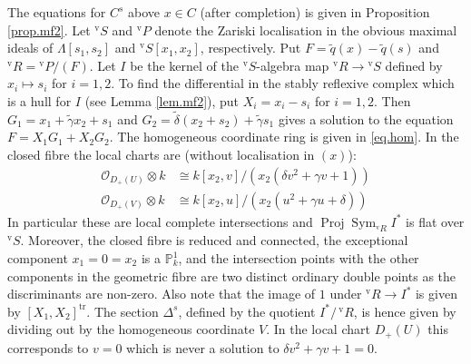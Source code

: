\documentclass[a4paper,10pt]{amsart}
\theoremstyle{plain}
\theoremstyle{definition}
\theoremstyle{remark}
\numberwithin{equation}{xx}
\DeclareMathOperator{\Proj}{Proj}
\DeclareMathOperator{\Sym}{Sym}
\newcommand{\ra}{\rightarrow}
\newcommand{\ot}{{\otimes}}
\newcommand{\vL}{\varLambda}
\newcommand{\BB}[1]{\mathbb{{#1}}}
\newcommand{\Q}{\mathcal{O}}
\begin{document}
The equations for \(C^{s}\) above \(x\in C\) (after completion) is given in Proposition \ref{prop.mf2}. Let \({}^{\text{v}\!}S\) and \({}^{\text{v}\!}P\) denote the Zariski localisation in the obvious maximal ideals of \(\vL[s_{1},s_{2}]\) and \({}^{\text{v}\!}S[x_{1},x_{2}]\), respectively. Put \(F=\tilde{q}(x)-\tilde{q}(s)\) and \({}^{\text{v}\!}R={}^{\text{v}\!}P/(F)\). Let \(I\) be the kernel of the \({}^{\text{v}\!}S\)-algebra map \({}^{\text{v}\!}R\ra {}^{\text{v}\!}S\) defined by \(x_{i}\mapsto s_{i}\) for \(i=1,2\). To find the differential in the stably reflexive complex which is a hull for \(I\) (see Lemma \ref{lem.mf2}), put \(X_{i}=x_{i}-s_{i}\) for \(i=1,2\). Then \(G_{1}=x_{1}+\tilde\gamma x_{2}+s_{1}\) and \(G_{2}=\tilde\delta (x_{2}+s_{2})+\tilde\gamma s_{1}\) gives a solution to the equation \(F=X_{1}G_{1}+X_{2}G_{2}\). The homogeneous coordinate ring is given in \eqref{eq.hom}. In the closed fibre the local charts are (without localisation in \((x)\)):
\begin{align}
\Q_{D_{+}(U)}\ot k &\cong k[x_{2},v]/(x_{2}(\delta v^{2}+\gamma v+1))\label{eq.v} \\
\Q_{D_{+}(V)}\ot k &\cong k[x_{2},u]/(x_{2}(u^{2}+\gamma u+ \delta))
\end{align}
In particular these are local complete intersections and \(\Proj\Sym_{{}^{\text{v}\!}R}I^{*}\) is flat over \({}^{\text{v}\!}S\). Moreover, the closed fibre is reduced and connected, the exceptional component \(x_{1}=0=x_{2}\) is a \(\BB{P}^{1}_{k}\), and the intersection points with the other components in the geometric fibre are two distinct ordinary double points as the discriminants are non-zero. Also note that the image of \(1\) under \({}^{\text{v}\!}R\ra I^{*}\) is given by \([X_{1},X_{2}]^{\text{tr}}\). The section \(\Delta^{s}\), defined by the quotient \(I^{*}/\,{}^{\text{v}\!}R\), is hence given by dividing out by the homogeneous coordinate \(V\). In the local chart \(D_{+}(U)\) this corresponds to \(v=0\) which is never a solution to \(\delta v^{2}+\gamma v+1=0\).
\end{document}
